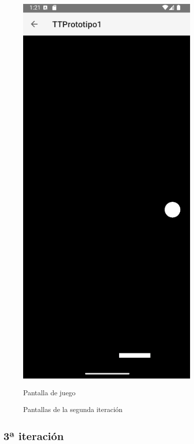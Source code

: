 \documentclass[a4paper,openright,12pt]{article}
\begin{document}
\begin{figure}[htp]
\begin{minipage}{0.3\textwidth}
        \includegraphics[width=0.8\textwidth]{Images/Vista_It2_3.png} 
        \caption{Pantalla de juego}
        \label{fig:figura2}
    \end{minipage}
    \caption{Pantallas de la segunda iteración}
    \label{fig:side_by_side}
\end{figure}

\subsection{3ª iteración}
\end{document}
